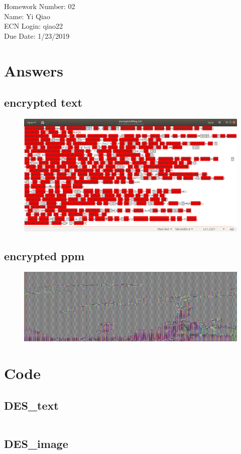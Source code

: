 \documentclass[11pt]{article}
\begin{document}
\noindent Homework Number: 02\\
Name: Yi Qiao\\
ECN Login: qiao22\\
Due Date: 1/23/2019\\
\section*{Answers}

\subsection*{encrypted text}
\begin{figure}[h]
\centering
\includegraphics[width=0.8\linewidth]{encryptedMsg.png}
\end{figure}

\subsection*{encrypted ppm}
\begin{figure}[h]
\centering
\includegraphics[width=0.8\linewidth]{image_enc.jpg}
\end{figure}
\pagebreak

\section*{Code}
\subsection*{DES\_text}
\inputminted{python}{DES_text.py}
\pagebreak
\subsection*{DES\_image}
\inputminted{python}{DES_image.py}
\end{document}
